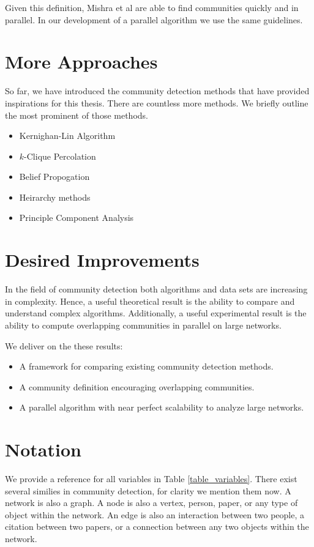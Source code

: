 \documentclass[phd,tocprelim]{cornell}
\begin{document}
Given this definition, Mishra et al\cite{mishra} are able to find communities quickly and in parallel.  In our development of a parallel algorithm we use the same guidelines.

\section {More Approaches}

So far, we have introduced the community detection methods that have provided inspirations for this thesis.  There are countless more methods.  We briefly outline the most prominent of those methods.

\begin{itemize}
\item Kernighan-Lin Algorithm
\item $k$-Clique Percolation
\item Belief Propogation
\item Heirarchy methods
\item Principle Component Analysis
\end{itemize}


\section {Desired Improvements}

In the field of community detection both algorithms and data sets are increasing in complexity.  Hence, a useful theoretical result is the ability to compare and understand complex algorithms.  Additionally, a useful experimental result is the ability to compute overlapping communities in parallel on large networks.

We deliver on the these results:
\begin{itemize}
\item A framework for comparing existing community detection methods.
\item A community definition encouraging overlapping communities.
\item A parallel algorithm with near perfect scalability to analyze large networks.
\end{itemize}


\section{Notation}

We provide a reference for all variables in Table \ref{table_variables}.  There exist several similies in community detection, for clarity we mention them now.  A network is also a graph.  A node is also a vertex, person, paper, or any type of object within the network.  An edge is also an interaction between two people, a citation between two papers, or a connection between any two objects within the network.
\end{document}
